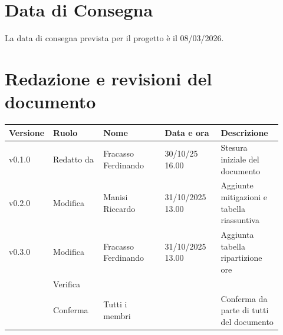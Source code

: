 \documentclass[a4paper,12pt]{article}
\begin{document}
\section{Data di Consegna}
La data di consegna prevista per il progetto è il 08/03/2026.

\clearpage
\section{Redazione e revisioni del documento}

\begin{center}
\small
\renewcommand{\arraystretch}{1.2} 
\begin{tabular}{|p{0.1\linewidth}|p{0.18\linewidth}|p{0.22\linewidth}|p{0.20\linewidth}|p{0.22\linewidth}|}
\hline
\rowcolor{gray!60} 
\textbf{Versione} & \textbf{Ruolo} & \textbf{Nome} & \textbf{Data e ora} & \textbf{Descrizione} \\
\hline
\rowcolor{white}
v0.1.0 & Redatto da & Fracasso Ferdinando & 30/10/25 16.00 & Stesura iniziale del documento \\
\hline
\rowcolor{gray!20}
v0.2.0 & Modifica & Manisi Riccardo & 31/10/2025 13.00 & Aggiunte mitigazioni e tabella riassuntiva \\
\hline
\rowcolor{white}
v0.3.0 & Modifica & Fracasso Ferdinando & 31/10/2025 13.00 & Aggiunta tabella ripartizione ore \\
\hline
\rowcolor{gray!20}
 & Verifica &  &  &  \\
\hline
\rowcolor{white}
 & Conferma & Tutti i membri &  & Conferma da parte di tutti del documento \\
\hline
\end{tabular}
\end{center}
\end{document}

